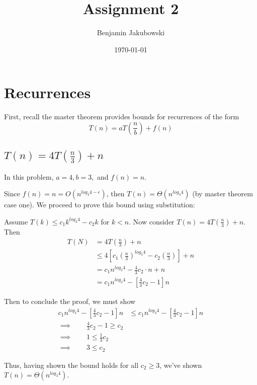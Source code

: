\documentclass[paper=a4, fontsize=11pt]{scrartcl} %
\title{	Assignment 2}
\author{Benjamin Jakubowski} %
\date{\normalsize\today} %
\numberwithin{equation}{section} %
\numberwithin{figure}{section} %
\numberwithin{table}{section} %
\begin{document}
\maketitle %


\section{Recurrences}

First, recall the master theorem provides bounds for recurrences of the form
\[T(n) = a T\left(\frac{n}{b}\right) + f(n)\]

\subsection{$T(n) = 4 T\left(\frac{n}{3}\right) + n$}

In this problem, $a = 4, b = 3, $ and $f(n) = n$.

Since $f(n) = n = O(n^{log_{3} 4 - \epsilon})$, then $T(n) = \Theta(n^{log_{3} 4})$ (by master theorem case one). We proceed to prove this bound using substitution:

Assume $T(k) \leq c_1 k^{log_3 4} - c_2 k$ for $k < n$. Now consider $T(n) = 4 T\left(\frac{n}{3}\right) + n$. Then
\begin{align*}
T(N) &= 4 T\left(\frac{n}{3}\right) + n\\
	&\leq 4 \left[c_1 \left(\frac{n}{3}\right)^{log_3 4} - c_2 \left(\frac{n}{3}\right)\right] + n\\
	&= c_1 n^{log_3 4} - \frac{4}{3} c_2\cdot n+ n\\
	&= c_1 n^{log_3 4} - \left[\frac{4}{3} c_2 - 1\right] n
\end{align*}

Then to conclude the proof, we must show 
\begin{align*} 
c_1 n^{log_3 4} - \left[\frac{4}{3} c_2 - 1\right] n &\leq c_1 n^{log_3 4} - \left[\frac{4}{3} c_2 - 1\right] n \\
\implies \qquad{} \frac{4}{3} c_2 - 1 \geq c_2\\
\implies \qquad{} 1 \leq \frac{1}{3} c_2\\
\implies \qquad{} 3 \leq c_2
\end{align*}

Thus, having shown the bound holds for all $c_2\geq 3$, we've shown $T(n) = \Theta(n^{log_{3} 4})$.
\end{document}
